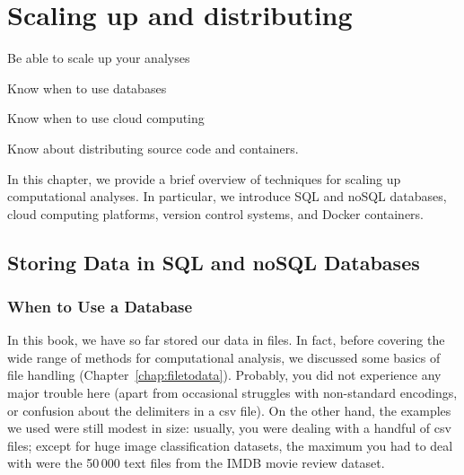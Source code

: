 \chapter{Scaling up and distributing}
\label{chap:scalingup}

\begin{abstract}{Abstract}
  Throughout this book, we have been working with examples that consist of
  code to conduct one specific analysis of data sets of modest size.
  But at some point, you may want to scale up. You may want  others
  to be able to  apply your code to their data; and you may want to be able to also
  use your own analyses on larger and more complex datasets. Or you may
  need to run analyses that your own computer cannot deal with.
  This chapter deals with such  steps and points you to some techniques that become increasingly useful
  the larger your projects get.
\end{abstract}



\begin{objectives}
\item Be able to scale up your analyses
\item Know when to use databases
\item Know when to use cloud computing
\item Know about distributing source code and containers.
\end{objectives}

\begin{feature}
In this chapter, we provide a brief overview of techniques for scaling up computational analyses. In particular, we introduce SQL and noSQL databases, cloud computing platforms, version control systems, and Docker containers.
\end{feature}


%

\section{Storing Data in SQL and noSQL Databases}
\label{sec:databases}

\subsection{When to Use a Database}\label{sec:whendb}

In this book, we have so far stored our data in files. In fact, before
covering the wide range of methods for computational analysis, we
discussed some basics of file handling
(Chapter~\ref{chap:filetodata}). Probably, you did not experience any major
trouble here (apart from occasional struggles with non-standard
encodings, or confusion about the delimiters in a csv file). On the
other hand, the examples we used were still modest in size: usually,
you were dealing with a handful of csv files; except for huge image classification datasets, the maximum you had to
deal with were the 50\,000 text files from the IMDB movie review
dataset.

